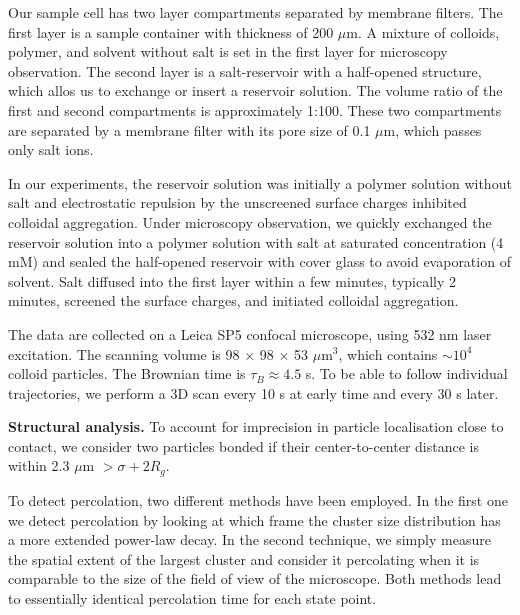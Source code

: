 \documentclass[12pt,onecolumn]{revtex4}
\begin{document}
Our sample cell has two layer compartments separated by membrane filters. The first layer is a sample container with thickness of 200 $\mu$m. A mixture of colloids, polymer, and solvent without salt is  set in the first layer for microscopy observation. The second layer is a salt-reservoir with a half-opened structure, which allos us to exchange or insert a reservoir solution. The volume ratio of the first and second compartments is approximately 1:100. These two compartments are separated by a membrane filter with its pore size of 0.1 $\mu$m, which passes only salt ions. 

In our experiments, the reservoir solution was initially a polymer solution without salt and electrostatic repulsion by the unscreened surface charges inhibited colloidal aggregation. Under microscopy observation, we quickly exchanged the reservoir solution into a polymer solution with salt at saturated concentration (4 mM) and sealed the half-opened reservoir with cover glass to avoid evaporation of solvent. Salt diffused into the first layer within a few minutes, typically 2 minutes, screened the surface charges, and initiated colloidal aggregation. 

The data are collected on a Leica SP5 confocal microscope, using 532 nm laser excitation. The scanning volume is 98 $\times$ 98 $\times$ 53 $\mu$m$^3$, which contains $\sim 10^4$ colloid particles.  The Brownian time is $\tau_B \approx 4.5$ s. To be able to follow individual trajectories, we perform a 3D scan every 10 s at early time and every 30 s later.





%

\noindent
{\bf Structural analysis.}
To account for imprecision in particle localisation close to contact, we consider two particles bonded if their center-to-center distance is within 2.3 $\mu$m $>\sigma+2R_g$.

To detect percolation, two different methods have been employed. In the first one we detect percolation
by looking at which frame the cluster size distribution has a more extended power-law decay. In the second technique,
we simply measure the spatial extent of the largest cluster and consider it percolating when it is comparable to the
size of the field of view of the microscope. Both methods lead to essentially identical percolation time for each state point.





%


\end{document}
